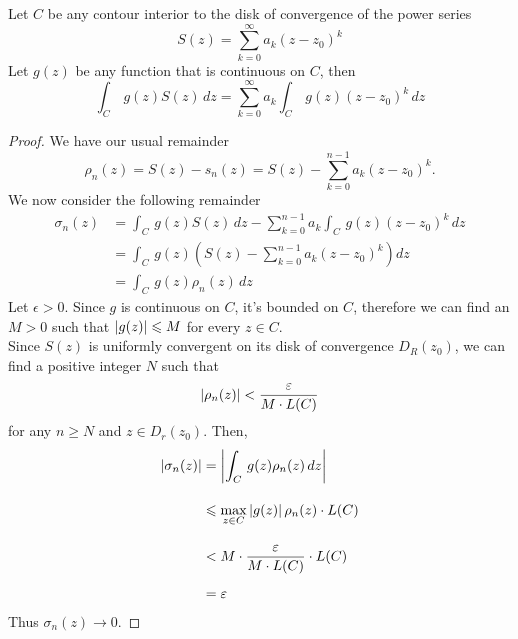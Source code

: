 \begin{theorem}\label{inttermbyterm}
Let $C$ be any contour interior to the disk of convergence of the power series
\[S(z) = \sum_{k=0}^\infty a_k(z - z_0)^k\]
Let $g(z)$ be any function that is continuous on $C$, then
\[\int_C\,g(z)S(z)\,dz = \sum_{k=0}^\infty a_k\int_C\,g(z)(z - z_0)^k\,dz\]
\end{theorem}
\begin{proof}
We have our usual remainder \[\rho_n(z) = S(z) - s_n(z) = S(z) - \sum_{k=0}^{n-1} a_k(z - z_0)^k.\]
We now consider the following remainder
\begin{align*}
\sigma_n(z) &= \int_C\,g(z)S(z)\,dz - \sum_{k=0}^{n-1} a_k\int_C\,g(z)(z - z_0)^k\,dz\\[1em]
 &= \int_C\,g(z)\left(S(z) - \sum_{k=0}^{n-1} a_k(z - z_0)^k\right)dz\\[1em]
 &= \int_C\,g(z)\rho_n(z)\,dz
\end{align*}
Let $\epsilon > 0$. Since $g$ is continuous on $C$, it's bounded on $C$, therefore we can find an $M > 0$ such that $\left\lvert g(z)\right\rvert \leqslant M$ for every $z \in C$.\\[0.5em]
Since $S(z)$ is uniformly convergent on its disk of convergence $D_R(z_0)$, we can find a positive integer $N$ such that \[\left\lvert\rho_n(z)\right\rvert < \frac{\varepsilon}{M\cdot L(C)}\] for any $n \geq N$ and $z \in D_r(z_0)$. Then, 
\begin{align*}
\left\lvert\sigma_n(z)\right\rvert &= \left\lvert\int_C\,g(z)\rho_n(z)\,dz\right\rvert\\[1em]
 &\leqslant  \max_{z \in C}\left\lvert g(z)\right\rvert{\rho_n(z)}\cdot L(C)\\[1em]
 &<  M\cdot\frac{\varepsilon}{M\cdot L(C)}\cdot L(C)\\[0.5em]
 &= \varepsilon
\end{align*}
Thus $\sigma_n(z) \to 0$.
\end{proof}

%

\vspace*{1em}

